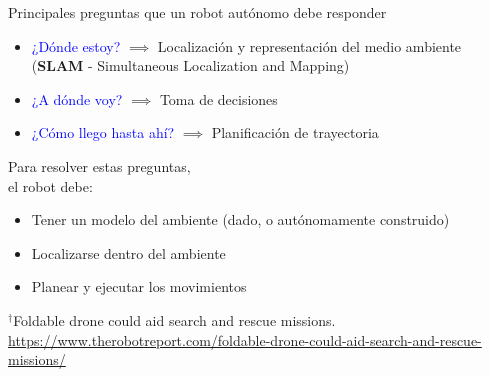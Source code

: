 \documentclass[
  24pt, %
  aspectratio=169, %
]{beamer}
\begin{document}
\begin{frame}  
  Principales preguntas que un robot autónomo debe responder \footnotemark
  \bigskip %
  \begin{itemize}
  \item \textcolor{blue}{¿Dónde estoy?} $\implies$ Localización y representación del medio ambiente (\textbf{SLAM} - Simultaneous Localization and Mapping) \pause 
  \item \textcolor{blue}{¿A dónde voy?} $\implies$ Toma de decisiones \pause  %
  \item \textcolor{blue}{¿Cómo llego hasta ahí?} $\implies$ Planificación de trayectoria 
  \end{itemize}
  \pause
  \bigskip %

  \begin{minipage}{0.47\textwidth}
    Para resolver estas preguntas,\\
    el robot debe: 
    
    \begin{itemize}
    \item Tener un modelo del ambiente (dado, o autónomamente construido)
    \item Localizarse dentro del ambiente
    \item Planear y ejecutar los movimientos
    \end{itemize}
    
  \end{minipage}
  \hspace{0.2cm}
  \begin{minipage}{0.5\textwidth}
    \centering
    \rule{0in}{1.2em}$^\dag$\scriptsize Foldable drone could aid search and rescue missions.\\
    \tiny \url{https://www.therobotreport.com/foldable-drone-could-aid-search-and-rescue-missions/} 
  \end{minipage}
\end{frame}
\end{document}
